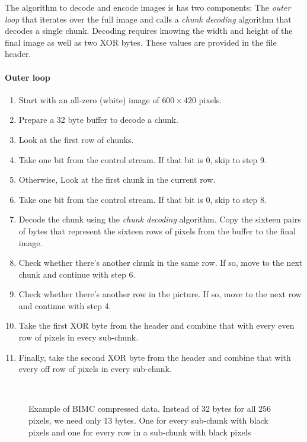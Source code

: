 The algorithm to decode and encode images is has two components: The \textit{outer loop} that iterates over the full image and calls a \textit{chunk decoding} algorithm that decodes a single chunk. Decoding requires knowing the width and height of the final image as well as two XOR bytes. These values are provided in the file header.

\paragraph{Outer loop}

\begin{enumerate}
    \item Start with an all-zero (white) image of $600 \times 420$ pixels.
    \item Prepare a 32 \gls{byte} buffer to decode a chunk.
    \item Look at the first row of chunks.
    \item Take one bit from the control stream. If that bit is $0$, skip to step 9.
    \item Otherwise, Look at the first chunk in the current row.
    \item Take one bit from the control stream. If that bit is $0$, skip to step 8.
    \item Decode the chunk using the \textit{chunk decoding} algorithm. Copy the sixteen pairs of \glspl{byte} that represent the sixteen rows of pixels from the buffer to the final image.
    \item Check whether there's another chunk in the same row. If so, move to the next chunk and continue with step 6.
    \item Check whether there's another row in the picture. If so, move to the next row and continue with step 4.
    \item Take the first XOR byte from the header and combine that with every even row of pixels in every sub-chunk.
    \item Finally, take the second XOR byte from the header and combine that with every off row of pixels in every sub-chunk.
\end{enumerate}

\begin{figure}[h]
    \centering
    \\[1mm]%
    \caption{Example of BIMC compressed data. Instead of 32 \glspl{byte} for all 256 pixels, we need only 13 \glspl{byte}. One for every sub-chunk with black pixels and one for every row in a sub-chunk with black pixels}
    \label{fig:bimc_subchunk_data}
\end{figure}

